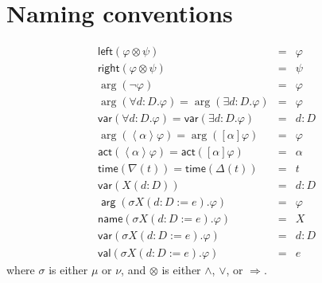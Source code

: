 \documentclass{article}
\begin{document}
\section{Naming conventions}

\[
\begin{array}{lcl}
\mathsf{left}(\varphi \otimes \psi ) & = & \varphi  \\
\mathsf{right}(\varphi \otimes \psi ) & = & \psi  \\
\arg (\lnot \varphi ) & = & \varphi  \\
\arg (\forall d:D.\varphi )=\arg (\exists d:D.\varphi ) & = & \varphi  \\
\mathsf{var}(\forall d:D.\varphi )=\mathsf{var}(\exists d:D.\varphi ) & = &
d:D \\
\arg (\left\langle \alpha \right\rangle \varphi )=\arg ([\alpha ]\varphi ) &
= & \varphi  \\
\mathsf{act}(\left\langle \alpha \right\rangle \varphi )=\mathsf{act}%
([\alpha ]\varphi ) & = & \alpha  \\
\mathsf{time}(\nabla (t))=\mathsf{time}(\Delta (t)) & = & t \\
\mathsf{var}(X(d:D)) & = & d:D \\
\mathsf{\arg }(\sigma X(d:D:=e).\varphi ) & = & \varphi  \\
\mathsf{name}(\sigma X(d:D:=e).\varphi ) & = & X \\
\mathsf{var}(\sigma X(d:D:=e).\varphi ) & = & d:D \\
\mathsf{val}(\sigma X(d:D:=e).\varphi ) & = & e%
\end{array}%
\]%
where $\sigma $ is either $\mu $ or $\nu $, and $\otimes $ is either $\wedge
$, $\vee $, or $\Rightarrow $.
\end{document}
